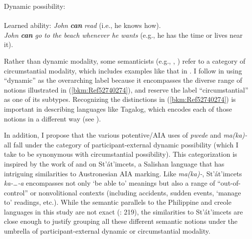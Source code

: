 \documentclass[output=paper,colorlinks,citecolor=brown]{langscibook}
\begin{document}
\ea
{\label{bkm:Ref52740274}
Dynamic possibility:}\\
    \\
        \ea Learned ability: \textit{John} \textbf{\textit{can}} \textit{read} (i.e., he knows how).
        \z
    \\
    {\label{bkm:Ref52740274.8b}}
         \textit{John \textbf{can} go to the beach whenever he wants} {(e.g., he has the time or lives near it).}\\
        \z
    \z
\z


Rather than dynamic modality, some semanticists (e.g., \citealt{Kratzer1991}, \citealt{MatthewsonDavis2005}) refer to a category of circumstantial modality, which includes examples like that in . I follow \citet{Palmer2001} in using “dynamic” as the overarching label because it encompasses the diverse range of notions illustrated in (\ref{bkm:Ref52740274}), and reserve the label “circumstantial” as one of its subtypes. Recognizing the distinctions in (\ref{bkm:Ref52740274}) is important in describing languages like Tagalog, which encodes each of those notions in a different way (see ).

In addition, I propose that the various potentive/AIA uses of \textit{pwede} and \textit{ma(ka)-} all fall under the category of participant-external dynamic possibility (which I take to be synonymous with circumstantial possibility). This categorization is inspired by the work of \citet{MatthewsonDavis2005} and \citet{DavisRullmann2009} on St’át’imcets, a Salishan language that has intriguing similarities to Austronesian AIA marking. Like \textit{ma(ka)-}, St’át’imcets \textit{ka-…-a} encompasses not only ‘be able to’ meanings but also a range of “out-of-control” or nonvolitional contexts (including accidents, sudden events, ‘manage to’ readings, etc.). While the semantic parallels to the Philippine and creole languages in this study are not exact (\citealt{DavisRullmann2009}: 219), the similarities to St’át’imcets are close enough to justify grouping all these different semantic notions under the umbrella of participant-external dynamic or circumstantial modality. 
\end{document}
